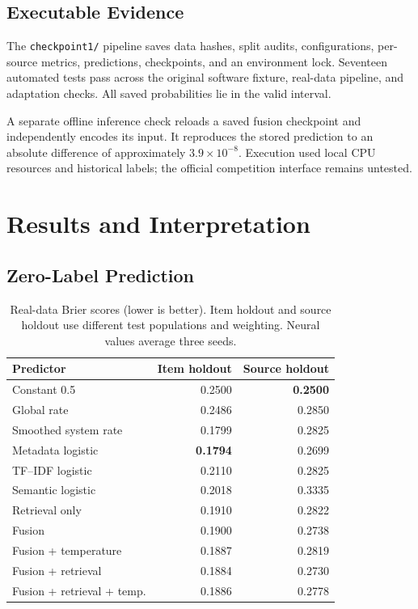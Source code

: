 \documentclass[conference]{IEEEtran}
\begin{document}
\subsection{Executable Evidence}
The \texttt{checkpoint1/} pipeline saves data hashes, split audits, configurations, per-source metrics, predictions, checkpoints, and an environment lock. Seventeen automated tests pass across the original software fixture, real-data pipeline, and adaptation checks. All saved probabilities lie in the valid interval.

A separate offline inference check reloads a saved fusion checkpoint and independently encodes its input. It reproduces the stored prediction to an absolute difference of approximately $3.9\times10^{-8}$. Execution used local CPU resources and historical labels; the official competition interface remains untested.

\section{Results and Interpretation}
\subsection{Zero-Label Prediction}
\begin{table}[t]
\caption{Real-data Brier scores (lower is better). Item holdout and source holdout use different test populations and weighting. Neural values average three seeds.}
\label{tab:results}\centering\small
\begin{tabular}{@{}lrr@{}}
\toprule
Predictor & Item holdout & Source holdout \\
\midrule
Constant 0.5 & 0.2500 & \textbf{0.2500} \\
Global rate & 0.2486 & 0.2850 \\
Smoothed system rate & 0.1799 & 0.2825 \\
Metadata logistic & \textbf{0.1794} & 0.2699 \\
TF--IDF logistic & 0.2110 & 0.2825 \\
Semantic logistic & 0.2018 & 0.3335 \\
Retrieval only & 0.1910 & 0.2822 \\
Fusion & 0.1900 & 0.2738 \\
Fusion + temperature & 0.1887 & 0.2819 \\
Fusion + retrieval & 0.1884 & 0.2730 \\
Fusion + retrieval + temp. & 0.1886 & 0.2778 \\
\bottomrule
\end{tabular}
\end{table}
\end{document}

